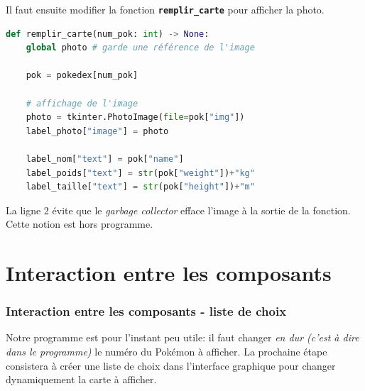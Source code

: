 \documentclass[svgnames,11pt]{beamer}
\begin{document}
\begin{frame}[fragile]
    \frametitle{}

    Il faut ensuite modifier la fonction \textbf{\texttt{remplir\_carte}} pour afficher la photo.

    \begin{center}
        \begin{lstlisting}[language=Python , basicstyle=\ttfamily\small, xleftmargin=1em, xrightmargin=1em]
def remplir_carte(num_pok: int) -> None:
    global photo # garde une référence de l'image

    pok = pokedex[num_pok]

    # affichage de l'image
    photo = tkinter.PhotoImage(file=pok["img"])
    label_photo["image"] = photo

    label_nom["text"] = pok["name"]
    label_poids["text"] = str(pok["weight"])+"kg"
    label_taille["text"] = str(pok["height"])+"m"
\end{lstlisting}
    \end{center}
    \begin{aretenir}[Commentaire]
        La ligne 2 évite que le \emph{garbage collector} efface l'image à la sortie de la fonction. Cette notion est hors programme.
    \end{aretenir}
\end{frame}
\section{Interaction entre les composants}
\begin{frame}
    \frametitle{Interaction entre les composants - liste de choix}

    Notre programme est pour l'instant peu utile: il faut changer \emph{en dur (c'est à dire dans le programme)} le numéro du Pokémon à afficher. La prochaine étape consistera à créer une liste de choix dans l'interface graphique pour changer dynamiquement la carte à afficher.


\end{frame}
\end{document}
